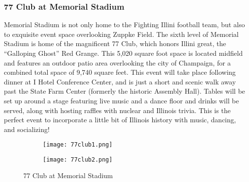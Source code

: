 \subsubsection{77 Club at Memorial Stadium}
Memorial Stadium is not only home to the Fighting Illini football team, but also to exquisite event space overlooking Zuppke Field. The sixth level of Memorial Stadium is home of the magnificent 77 Club, which honors Illini great, the ``Galloping Ghost'' Red Grange. This 5,020 square foot space is located midfield and features an outdoor patio area overlooking the city of Champaign, for a combined total space of 9,740 square feet. This event will take place following dinner at I Hotel Conference Center, and is just a short and scenic walk away past the State Farm Center (formerly the historic Assembly Hall). Tables will be set up around a stage featuring live music and a dance floor and drinks will be served, along with hosting raffles with nuclear and Illinois trivia. This is the perfect event to incorporate a little bit of Illinois history with music, dancing, and socializing! 
\vspace{0.5cm}\newline
\begin{figure}[H]

	\centering
	\begin{subfigure}{0.5\textwidth}
		\centering
		\texttt{[image: 77club1.png]}
	\end{subfigure}%
	\begin{subfigure}{0.5\textwidth}
		\centering
		\texttt{[image: 77club2.png]}
	\end{subfigure}
	\caption{77 Club at Memorial Stadium}		
\end{figure} 

